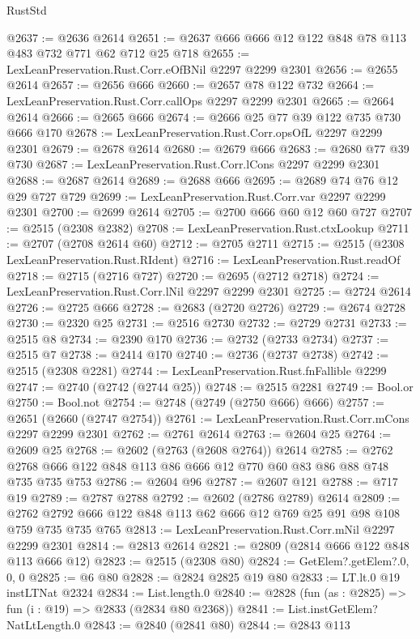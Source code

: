 \begin{lexlean}{RustStd}
\begin{coremodule}
@2637 := @2636 @2614
@2651 := @2637 @666 @666 @12 @122 @848 @78 @113 @483 @732 @771 @62 @712 @25 @718
@2655 := LexLeanPreservation.Rust.Corr.eOfBNil @2297 @2299 @2301
@2656 := @2655 @2614
@2657 := @2656 @666
@2660 := @2657 @78 @122 @732
@2664 := LexLeanPreservation.Rust.Corr.callOps @2297 @2299 @2301
@2665 := @2664 @2614
@2666 := @2665 @666
@2674 := @2666 @25 @77 @39 @122 @735 @730 @666 @170
@2678 := LexLeanPreservation.Rust.Corr.opsOfL @2297 @2299 @2301
@2679 := @2678 @2614
@2680 := @2679 @666
@2683 := @2680 @77 @39 @730
@2687 := LexLeanPreservation.Rust.Corr.lCons @2297 @2299 @2301
@2688 := @2687 @2614
@2689 := @2688 @666
@2695 := @2689 @74 @76 @12 @29 @727 @729
@2699 := LexLeanPreservation.Rust.Corr.var @2297 @2299 @2301
@2700 := @2699 @2614
@2705 := @2700 @666 @60 @12 @60 @727
@2707 := @2515 (@2308 @2382)
@2708 := LexLeanPreservation.Rust.ctxLookup
@2711 := @2707 (@2708 @2614 @60)
@2712 := @2705 @2711
@2715 := @2515 (@2308 LexLeanPreservation.Rust.RIdent)
@2716 := LexLeanPreservation.Rust.readOf
@2718 := @2715 (@2716 @727)
@2720 := @2695 (@2712 @2718)
@2724 := LexLeanPreservation.Rust.Corr.lNil @2297 @2299 @2301
@2725 := @2724 @2614
@2726 := @2725 @666
@2728 := @2683 (@2720 @2726)
@2729 := @2674 @2728
@2730 := @2320 @25
@2731 := @2516 @2730
@2732 := @2729 @2731
@2733 := @2515 @8
@2734 := @2390 @170
@2736 := @2732 (@2733 @2734)
@2737 := @2515 @7
@2738 := @2414 @170
@2740 := @2736 (@2737 @2738)
@2742 := @2515 (@2308 @2281)
@2744 := LexLeanPreservation.Rust.fnFallible @2299
@2747 := @2740 (@2742 (@2744 @25))
@2748 := @2515 @2281
@2749 := Bool.or
@2750 := Bool.not
@2754 := @2748 (@2749 (@2750 @666) @666)
@2757 := @2651 (@2660 (@2747 @2754))
@2761 := LexLeanPreservation.Rust.Corr.mCons @2297 @2299 @2301
@2762 := @2761 @2614
@2763 := @2604 @25
@2764 := @2609 @25
@2768 := @2602 (@2763 (@2608 @2764)) @2614
@2785 := @2762 @2768 @666 @122 @848 @113 @86 @666 @12 @770 @60 @83 @86 @88 @748 @735 @735 @753
@2786 := @2604 @96
@2787 := @2607 @121
@2788 := @717 @19
@2789 := @2787 @2788
@2792 := @2602 (@2786 @2789) @2614
@2809 := @2762 @2792 @666 @122 @848 @113 @62 @666 @12 @769 @25 @91 @98 @108 @759 @735 @735 @765
@2813 := LexLeanPreservation.Rust.Corr.mNil @2297 @2299 @2301
@2814 := @2813 @2614
@2821 := @2809 (@2814 @666 @122 @848 @113 @666 @12)
@2823 := @2515 (@2308 @80)
@2824 := GetElem?.getElem?.{0, 0, 0}
@2825 := @6 @80
@2828 := @2824 @2825 @19 @80
@2833 := LT.lt.{0} @19 instLTNat @2324
@2834 := List.length.{0}
@2840 := @2828 (fun (as : @2825) => fun (i : @19) => @2833 (@2834 @80 @2368))
@2841 := List.instGetElem?NatLtLength.{0}
@2843 := @2840 (@2841 @80)
@2844 := @2843 @113

\end{coremodule}
\end{lexlean}
